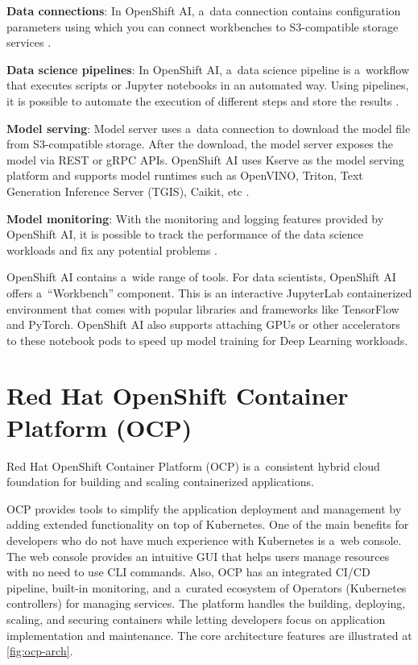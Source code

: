 \medskip

\textbf{Data connections}:
In OpenShift AI, a~data connection contains configuration parameters using which you can connect workbenches to S3-compatible storage services \cite{Midha2024}.

\medskip

\textbf{Data science pipelines}:
In OpenShift AI, a~data science pipeline is a~workflow that executes scripts or Jupyter notebooks in an automated way. Using pipelines, it is possible to automate the execution of different steps and store the results \cite{Midha2024}.

\medskip

\textbf{Model serving}:
Model server uses a~data connection to download the model file from S3-compatible storage. After the download, the model server exposes the model via REST or gRPC APIs. OpenShift AI uses Kserve as the model serving platform and supports model runtimes such as OpenVINO, Triton, Text Generation Inference Server (TGIS), Caikit, etc \cite{Midha2024}.

\medskip

\textbf{Model monitoring}:
With the monitoring and logging features provided by OpenShift AI, it is possible to track the performance of the data science workloads and fix any potential problems \cite{Midha2024}. 

\medskip

OpenShift AI contains a~wide range of tools. For data scientists, OpenShift AI offers a~\enquote{Workbench} component. This is an interactive JupyterLab containerized environment that comes with popular libraries and frameworks like TensorFlow and PyTorch. OpenShift AI also supports attaching GPUs or other accelerators to these notebook pods to speed up model training for Deep Learning workloads.

\section*{Red Hat OpenShift Container Platform (OCP)}

Red Hat OpenShift Container Platform (OCP) is a~consistent hybrid cloud foundation for building and scaling containerized applications.

OCP provides tools to simplify the application deployment and management by adding extended functionality on top of Kubernetes. One of the main benefits for developers who do not have much experience with Kubernetes is a~web console. The web console provides an intuitive GUI that helps users manage resources with no need to use CLI commands. Also, OCP has an integrated CI/CD pipeline, built-in monitoring, and a~curated ecosystem of Operators (Kubernetes controllers) for managing services. The platform handles the building, deploying, scaling, and securing containers while letting developers focus on application implementation and maintenance. The core architecture features are illustrated at \autoref{fig:ocp-arch}.


